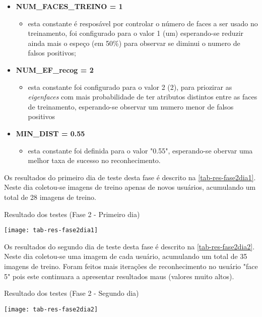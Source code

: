 \begin{itemize}	
	\item \textbf{NUM\_FACES\_TREINO = 1}
	\begin{itemize}	
		\item esta constante é resposável por controlar o número de faces a ser usado no treinamento, foi configurado para o valor 1 (um) esperando-se reduzir ainda mais o espeço (em 50\%) para observar se diminui o numero de falsos positivos;
	\end{itemize}
	
	\item \textbf{NUM\_EF\_recog = 2}
	\begin{itemize}	
		\item esta constante foi configurado para o valor 2 (2), para priozirar as \textit{eigenfaces} com mais probabilidade de ter atributos distintos entre as faces de treinamento, esperando-se observar um numero menor de falsos positivos
	\end{itemize}
	
	\item \textbf{MIN\_DIST = 0.55}
	\begin{itemize}	
		\item esta constante foi definida para o valor "0.55", esperando-se obervar uma melhor taxa de sucesso no reconhecimento.
	\end{itemize}
\end{itemize}

Os resultados do primeiro dia de teste desta fase é descrito na \autoref{tab-res-fase2dia1}. Neste dia coletou-se imagens de treino apenas de novos usuários, acumulando um total de 28 imagens de treino. 


\begin{table}[h]
	\centering
	\caption{Resultado dos testes (Fase 2 - Primeiro dia) }
	\texttt{[image: tab-res-fase2dia1]}
	\label{tab-res-fase2dia1}
\end{table}


Os resultados do segundo dia de teste desta fase é descrito na \autoref{tab-res-fase2dia2}. Neste dia coletou-se uma imagem de cada usuário, acumulando um total de 35 imagens de treino. Foram feitos mais iterações de reconhecimento no usuário "face 5" pois este continuara a apresentar resultados maus (valores muito altos).


\begin{table}[h]
	\centering
	\caption{Resultado dos testes (Fase 2 - Segundo dia) }
	\texttt{[image: tab-res-fase2dia2]}
	\label{tab-res-fase2dia2}
\end{table}



